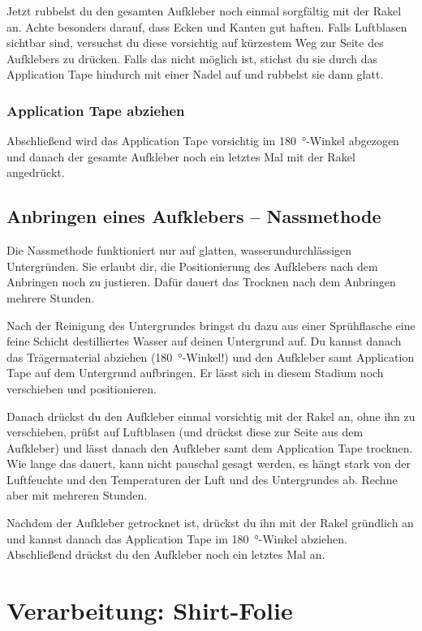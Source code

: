 \documentclass{\basedir/fablab-document}
\begin{document}
Jetzt rubbelst du den gesamten Aufkleber noch einmal sorgfältig mit der Rakel an.
Achte besonders darauf, dass Ecken und Kanten gut haften.
Falls Luftblasen sichtbar sind, versuchst du diese vorsichtig auf kürzestem Weg zur Seite des Aufklebers zu drücken.
Falls das nicht möglich ist, stichst du sie durch das Application Tape hindurch mit einer Nadel auf und rubbelst sie dann glatt.

\subsubsection{Application Tape abziehen}
Abschließend wird das Application Tape vorsichtig im \SI{180}{\degree}-Winkel abgezogen und danach der gesamte Aufkleber noch ein letztes Mal mit der Rakel angedrückt.

\subsection{Anbringen eines Aufklebers -- Nassmethode}
Die Nassmethode funktioniert nur auf glatten, wasserundurchlässigen Untergründen.
Sie erlaubt dir, die Positionierung des Aufklebers nach dem Anbringen noch zu justieren. Dafür dauert das Trocknen nach dem Anbringen mehrere Stunden.

Nach der Reinigung des Untergrundes bringst du dazu aus einer Sprühflasche eine feine Schicht destilliertes Wasser auf deinen Untergrund auf.
Du kannst danach das Trägermaterial abziehen (\SI{180}{\degree}-Winkel!) und den Aufkleber samt Application Tape auf dem Untergrund aufbringen.
Er lässt sich in diesem Stadium noch verschieben und positionieren.  

Danach drückst du den Aufkleber einmal vorsichtig mit der Rakel an, ohne ihn zu verschieben, prüfst auf Luftblasen (und drückst diese zur Seite aus dem Aufkleber) und lässt danach den Aufkleber samt dem Application Tape trocknen.
Wie lange das dauert, kann nicht pauschal gesagt werden, es hängt stark von der Luftfeuchte und den Temperaturen der Luft und des Untergrundes ab.
Rechne aber mit mehreren Stunden.

Nachdem der Aufkleber getrocknet ist, drückst du ihn mit der Rakel gründlich an und kannst danach das Application Tape im \SI{180}{\degree}-Winkel abziehen.
Abschließend drückst du den Aufkleber noch ein letztes Mal an. 

\section{Verarbeitung: Shirt-Folie} \label{VerarbeitungShirtfolie}
\end{document}
